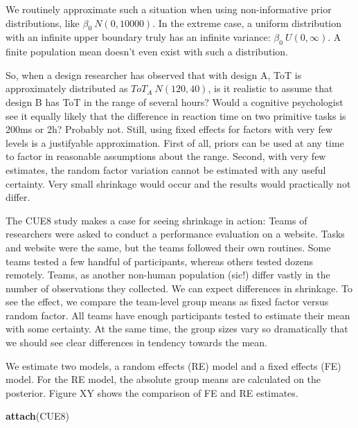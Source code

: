 \documentclass[]{svmono}
\newenvironment{Shaded}{\begin{snugshade}}{\end{snugshade}}
\newcommand{\KeywordTok}[1]{\textcolor[rgb]{0.13,0.29,0.53}{\textbf{#1}}}
\newcommand{\NormalTok}[1]{#1}
\begin{document}
We routinely approximate such a situation when using non-informative
prior distributions, like \(\beta_0 ~ N(0, 10000)\). In the extreme
case, a uniform distribution with an infinite upper boundary truly has
an infinite variance: \(\beta_0 ~ U(0, \infty)\). A finite population
mean doesn't even exist with such a distribution.

So, when a design researcher has observed that with design A, ToT is
approximately distributed as \(ToT_A ~ N(120, 40)\), is it realistic to
assume that design B has ToT in the range of several hours? Would a
cognitive psychologist see it equally likely that the difference in
reaction time on two primitive tasks is 200ms or 2h? Probably not.
Still, using fixed effects for factors with very few levels is a
justifyable approximation. First of all, priors can be used at any time
to factor in reasonable assumptions about the range. Second, with very
few estimates, the random factor variation cannot be estimated with any
useful certainty. Very small shrinkage would occur and the results would
practically not differ.

The CUE8 study makes a case for seeing shrinkage in action: Teams of
researchers were asked to conduct a performance evaluation on a website.
Tasks and website were the same, but the teams followed their own
routines. Some teams tested a few handful of participants, whereas
others tested dozens remotely. Teams, as another non-human population
(sic!) differ vastly in the number of observations they collected. We
can expect differences in shrinkage. To see the effect, we compare the
team-level group means as fixed factor versus random factor. All teams
have enough participants tested to estimate their mean with some
certainty. At the same time, the group sizes vary so dramatically that
we should see clear differences in tendency towards the mean.

We estimate two models, a random effects (RE) model and a fixed effects
(FE) model. For the RE model, the absolute group means are calculated on
the posterior. Figure XY shows the comparison of FE and RE estimates.

\begin{Shaded}
\begin{Highlighting}[]
\KeywordTok{attach}\NormalTok{(CUE8)}
\end{Highlighting}
\end{Shaded}
\end{document}
